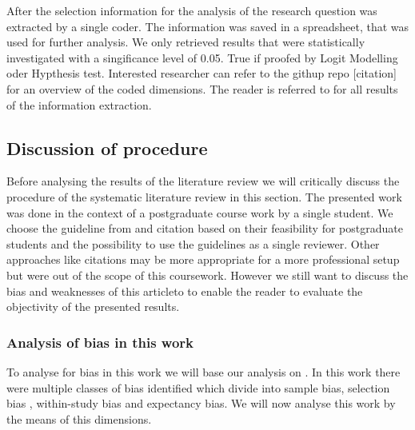 After the selection information for the analysis of the research question was extracted by a single coder. The information was saved in a spreadsheet, that was used for further analysis. We only retrieved results that were statistically investigated with a singificance level of 0.05. True if proofed by Logit Modelling oder Hypthesis test. Interested researcher can refer to the githup repo [citation] for an overview of the coded dimensions. The reader is referred to  \cite{langenbahn_data_2021} for all results of the information extraction. 


\subsection{Discussion of procedure}

Before analysing the results of the literature review we will critically discuss the procedure of the systematic literature review in this section. The presented work was done in the context of a postgraduate course work by a single student. We choose the guideline from \cite{silva_systematic_2016} and citation based on their feasibility for postgraduate students and the possibility to use the guidelines as a single reviewer. Other approaches like citations may be more appropriate for a more professional setup but were out of the scope of this coursework. However we still want to discuss the bias and weaknesses of this articleto to enable the reader to evaluate the objectivity of the presented results.


\subsubsection{Analysis of bias in this work}

To analyse for bias in this work we will base our analysis on \cite{durach_new_2017}. In this work there were multiple classes of bias identified which divide into sample bias, selection bias , within-study bias and expectancy bias. We will now analyse this work by the means of this dimensions.

